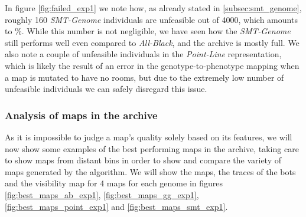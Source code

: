 In figure \ref{fig:failed_exp1} we note how, as already stated in \cref{subsec:smt_genome}, roughly 160 \textit{SMT-Genome} individuals are unfeasible out of 4000, which amounts to \%. While this number is not negligible, we have seen how the \textit{SMT-Genome} still performs well even compared to \textit{All-Black}, and the archive is mostly full. We also note a couple of unfeasible individuals in the \textit{Point-Line} representation, which is likely the result of an error in the genotype-to-phenotype mapping when a map is mutated to have no rooms, but due to the extremely low number of unfeasible individuals we can safely disregard this issue.   

\subsubsection*{Analysis of maps in the archive}
As it is impossible to judge a map's quality solely based on its features, we will now show some examples of the best performing maps in the archive, taking care to show maps from distant bins in order to show and compare the variety of maps generated by the algorithm. We will show the maps, the traces of the bots and the visibility map for 4 maps for each genome in figures \cref{fig:best_maps_ab_exp1}, \cref{fig:best_maps_gg_exp1}, \cref{fig:best_maps_point_exp1} and \cref{fig:best_maps_smt_exp1}.

